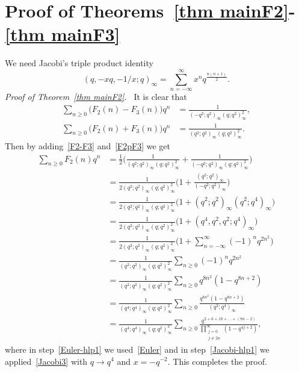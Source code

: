 \documentclass{amsart}
\numberwithin{equation}{section}
\theoremstyle{definition}
\newcommand{\fr}{\frac}
\begin{document}
\section{Proof of Theorems~\ref{thm mainF2}-\ref{thm mainF3}}\label{sec proof F23}
%
%
We need Jacobi's triple product identity~\cite[p. 12]{Gasper-Rahman}
\begin{equation}\label{Jacobi3}
(q,-xq,-1/x;q)_\infty = \sum_{n=-\infty}^{\infty} x^n q^{\fr{n(n+1)}{2}}.
\end{equation}
%
\emph{Proof of Theorem~\ref{thm mainF2}.\ }
It is clear that
\begin{align}
\sum_{n\geq 0} \big(F_2(n)-F_3(n)\big) q^n &= \fr{1}{(-q^2;q^2)_\infty (q;q^2)_\infty^2}, \label{F2-F3} \\
\sum_{n\geq 0} \big(F_2(n)+F_3(n)\big) q^n &= \fr{1}{(q^2;q^2)_\infty (q;q^2)_\infty^2}. \label{F2pF3}
\end{align}
Then by adding~\eqref{F2-F3} and~\eqref{F2pF3} we get
\begin{align}
\sum_{n\geq 0} F_2(n) q^n
&=\fr{1}{2} \Big( \fr{1}{(q^2;q^2)_\infty (q;q^2)_\infty^2} + \fr{1}{(-q^2;q^2)_\infty (q;q^2)_\infty^2} \Big) \nonumber \\
&=\fr{1}{2 (q^2;q^2)_\infty (q;q^2)_\infty^2} \Big( 1+ \fr{(q^2;q^2)_\infty}{(-q^2;q^2)_\infty} \Big)\nonumber \\
&=\fr{1}{2 (q^2;q^2)_\infty (q;q^2)_\infty^2} \big( 1+ (q^2;q^2)_\infty (q^2;q^4)_\infty \big) \label{Euler-hlp1} \\
&=\fr{1}{2 (q^2;q^2)_\infty (q;q^2)_\infty^2} \big( 1+ (q^4,q^2,q^2;q^4)_\infty \big) \nonumber\\
&=\fr{1}{2 (q^2;q^2)_\infty (q;q^2)_\infty^2} \Big( 1 +\sum_{n=-\infty}^\infty (-1)^n q^{2n^2} \Big) \label{Jacobi-hlp1} \\
&=\fr{1}{(q^2;q^2)_\infty (q;q^2)_\infty^2} \sum_{n\geq 0}(-1)^n q^{2n^2} \nonumber \\
&=\fr{1}{(q^2;q^2)_\infty (q;q^2)_\infty^2} \sum_{n\geq 0} q^{8n^2} (1-q^{8n+2}) \nonumber \\
&=\fr{1}{(q^4;q^4)_\infty (q;q^2)_\infty^2} \sum_{n\geq 0} \fr{q^{8n^2} (1-q^{8n+2})}{(q^2;q^4)_\infty} \nonumber \\
&=\fr{1}{(q^4;q^4)_\infty (q;q^2)_\infty^2} \sum_{n\geq 0} \fr{q^{2+6+10+\ldots+(8n-2)}}
{\displaystyle{\prod_{\substack{j=0 \\ j\ne 2n}}^{\infty}} (1-q^{4j+2})}, \nonumber
\end{align}
where in step~\eqref{Euler-hlp1} we used~\eqref{Euler} and in step~\eqref{Jacobi-hlp1} we applied~\eqref{Jacobi3} with
$q\to q^4$ and $x=-q^{-2}$.
This completes the proof.
\end{document}
